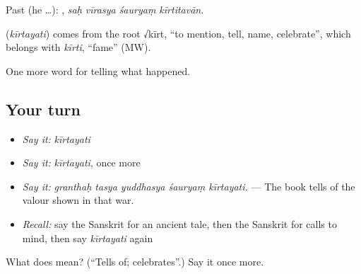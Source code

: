 Past (he …):    , \emph{saḥ vīrasya śauryaṃ kīrtitavān}.

\begin{cousinweb}
\textbf{} (\emph{kīrtayati}) comes from the root √kīrt, \textquotedblleft{}to mention, tell, name, celebrate\textquotedblright{}, which belongs with \emph{kīrti}, \textquotedblleft{}fame\textquotedblright{} (MW).
\end{cousinweb}

\begin{grammarlens}[title={What you've built}]
One more word for telling what happened.
\end{grammarlens}

\subsection*{Your turn}
\begin{itemize}
\raggedright
  \item \emph{Say it:} \emph{kīrtayati}
  \item \emph{Say it:} \emph{kīrtayati}, once more
  \item \emph{Say it:} \emph{granthaḥ tasya yuddhasya śauryaṃ kīrtayati.} — The book tells of the valour shown in that war.
  \item \emph{Recall:} say the Sanskrit for an ancient tale, then the Sanskrit for calls to mind, then say \emph{kīrtayati} again
\end{itemize}

\begin{tcolorbox}[breakable,colback=teal!4,colframe=teal!35!black,title={Before you move on}]
What does  mean? (\textquotedblleft{}Tells of; celebrates\textquotedblright{}.) Say it once more.
\end{tcolorbox}
